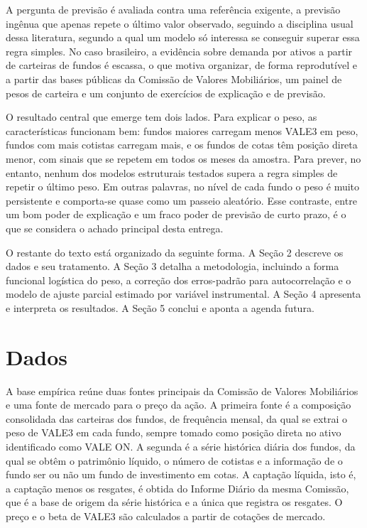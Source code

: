 \documentclass[12pt,a4paper]{article}
\begin{document}
A pergunta de previsão é avaliada contra uma referência exigente, a previsão ingênua que
apenas repete o último valor observado, seguindo a disciplina usual dessa literatura,
segundo a qual um modelo só interessa se conseguir superar essa regra simples. No caso
brasileiro, a evidência sobre demanda por ativos a partir de carteiras de fundos é escassa,
o que motiva organizar, de forma reprodutível e a partir das bases públicas da Comissão de
Valores Mobiliários, um painel de pesos de carteira e um conjunto de exercícios de
explicação e de previsão.

O resultado central que emerge tem dois lados. Para explicar o peso, as características
funcionam bem: fundos maiores carregam menos VALE3 em peso, fundos com mais cotistas carregam
mais, e os fundos de cotas têm posição direta menor, com sinais que se repetem em todos os
meses da amostra. Para prever, no entanto, nenhum dos modelos estruturais testados supera a
regra simples de repetir o último peso. Em outras palavras, no nível de cada fundo o peso é
muito persistente e comporta-se quase como um passeio aleatório. Esse contraste, entre um bom
poder de explicação e um fraco poder de previsão de curto prazo, é o que se considera o
achado principal desta entrega.

O restante do texto está organizado da seguinte forma. A Seção 2 descreve os dados e seu
tratamento. A Seção 3 detalha a metodologia, incluindo a forma funcional
logística do peso, a correção dos erros-padrão para autocorrelação e o modelo de ajuste parcial
estimado por variável instrumental. A Seção 4 apresenta e interpreta os
resultados. A Seção 5 conclui e aponta a agenda futura.

\section{Dados}

A base empírica reúne duas fontes principais da Comissão de Valores Mobiliários e uma fonte
de mercado para o preço da ação. A primeira fonte é a composição consolidada das carteiras
dos fundos, de frequência mensal, da qual se extrai o peso de VALE3 em cada fundo, sempre
tomado como posição direta no ativo identificado como VALE ON. A segunda é a série histórica
diária dos fundos, da qual se obtêm o patrimônio líquido, o número de cotistas e a informação
de o fundo ser ou não um fundo de investimento em cotas. A captação líquida, isto é, a
captação menos os resgates, é obtida do Informe Diário da mesma Comissão, que é a base de
origem da série histórica e a única que registra os resgates. O preço e o beta de VALE3 são
calculados a partir de cotações de mercado.
\end{document}
